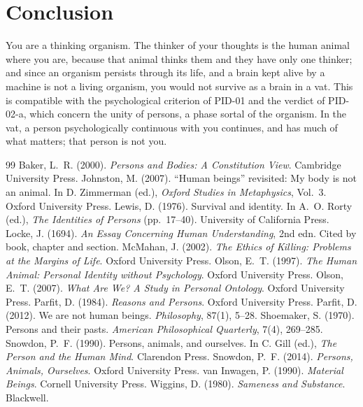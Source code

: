 \documentclass{situationist-preprint}
\begin{document}
\section{Conclusion}

You are a thinking organism. The thinker of your thoughts is the human animal where you are, because that animal thinks them and they have only one thinker; and since an organism persists through its life, and a brain kept alive by a machine is not a living organism, you would not survive as a brain in a vat. This is compatible with the psychological criterion of PID-01 and the verdict of PID-02-a, which concern the unity of persons, a phase sortal of the organism. In the vat, a person psychologically continuous with you continues, and has much of what matters; that person is not you.

\begin{thebibliography}{99}\small
{} Baker, L.~R. (2000). \emph{Persons and Bodies: A Constitution View}. Cambridge University Press.
 Johnston, M. (2007). \enquote{Human beings} revisited: My body is not an animal. In D. Zimmerman (ed.), \emph{Oxford Studies in Metaphysics}, Vol.~3. Oxford University Press.
 Lewis, D. (1976). Survival and identity. In A.~O. Rorty (ed.), \emph{The Identities of Persons} (pp.~17--40). University of California Press.
 Locke, J. (1694). \emph{An Essay Concerning Human Understanding}, 2nd edn. Cited by book, chapter and section.
 McMahan, J. (2002). \emph{The Ethics of Killing: Problems at the Margins of Life}. Oxford University Press.
 Olson, E.~T. (1997). \emph{The Human Animal: Personal Identity without Psychology}. Oxford University Press.
 Olson, E.~T. (2007). \emph{What Are We? A Study in Personal Ontology}. Oxford University Press.
 Parfit, D. (1984). \emph{Reasons and Persons}. Oxford University Press.
 Parfit, D. (2012). We are not human beings. \emph{Philosophy}, 87(1), 5--28.
 Shoemaker, S. (1970). Persons and their pasts. \emph{American Philosophical Quarterly}, 7(4), 269--285.
 Snowdon, P.~F. (1990). Persons, animals, and ourselves. In C. Gill (ed.), \emph{The Person and the Human Mind}. Clarendon Press.
 Snowdon, P.~F. (2014). \emph{Persons, Animals, Ourselves}. Oxford University Press.
 van Inwagen, P. (1990). \emph{Material Beings}. Cornell University Press.
 Wiggins, D. (1980). \emph{Sameness and Substance}. Blackwell.
\end{thebibliography}
\end{document}
